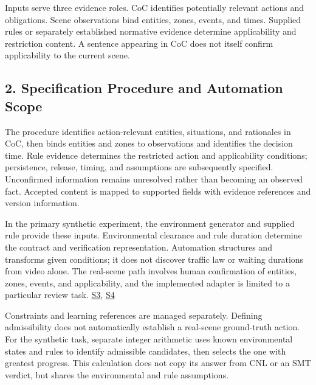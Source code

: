 \documentclass[11pt,a4paper]{article}
\begin{document}
Inputs serve three evidence roles. CoC identifies potentially relevant actions and obligations. Scene observations bind entities, zones, events, and times. Supplied rules or separately established normative evidence determine applicability and restriction content. A sentence appearing in CoC does not itself confirm applicability to the current scene.\par

\subsection*{2. Specification Procedure and Automation Scope}

The procedure identifies action-relevant entities, situations, and rationales in CoC, then binds entities and zones to observations and identifies the decision time. Rule evidence determines the restricted action and applicability conditions; persistence, release, timing, and assumptions are subsequently specified. Unconfirmed information remains unresolved rather than becoming an observed fact. Accepted content is mapped to supported fields with evidence references and version information.\par

In the primary synthetic experiment, the environment generator and supplied rule provide these inputs. Environmental clearance and rule duration determine the contract and verification representation. Automation structures and transforms given conditions; it does not discover traffic law or waiting durations from video alone. The real-scene path involves human confirmation of entities, zones, events, and applicability, and the implemented adapter is limited to a particular review task. \href{\detokenize{../../../../../../projects/04-guardsynth-coc/experiments/paper1_cnl_learning/temporal_training_data.py}}{S3}, \href{\detokenize{../../../../../../projects/04-guardsynth-coc/src/guard_synth/qualitative_scene_contract.py}}{S4}\par

Constraints and learning references are managed separately. Defining admissibility does not automatically establish a real-scene ground-truth action. For the synthetic task, separate integer arithmetic uses known environmental states and rules to identify admissible candidates, then selects the one with greatest progress. This calculation does not copy its answer from CNL or an SMT verdict, but shares the environmental and rule assumptions.\par
\end{document}
